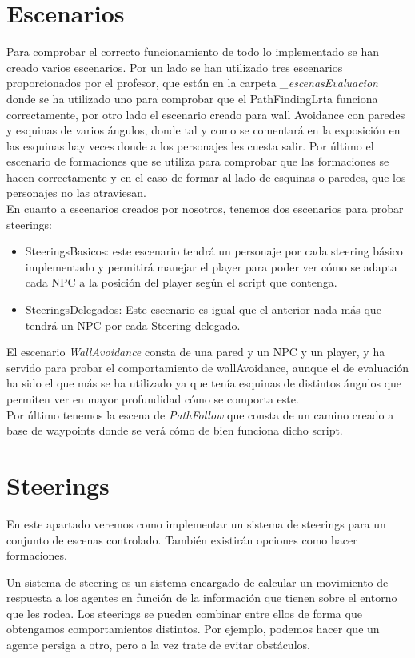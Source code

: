 \section{Escenarios}
Para comprobar el correcto funcionamiento de todo lo implementado se han creado varios escenarios. Por un lado se han utilizado tres escenarios proporcionados por el profesor, que están en la carpeta \textit{\_escenasEvaluacion} donde se ha utilizado uno para comprobar que el PathFindingLrta funciona correctamente, por otro lado el escenario creado para wall Avoidance con paredes y esquinas de varios ángulos, donde tal y como se comentará en la exposición en las esquinas hay veces donde a los personajes les cuesta salir. Por último el escenario de formaciones que se utiliza para comprobar que las formaciones se hacen correctamente y en el caso de formar al lado de esquinas o paredes, que los personajes no las atraviesan.\\

En cuanto a escenarios creados por nosotros, tenemos dos escenarios para probar steerings:
\begin{itemize}
    \item SteeringsBasicos: este escenario tendrá un personaje por cada steering básico implementado y permitirá manejar el player para poder ver cómo se adapta cada NPC a la posición del player según el script que contenga.
    \item SteeringsDelegados: Este escenario es igual que el anterior nada más que tendrá un NPC por cada Steering delegado.
\end{itemize}
El escenario \textit{WallAvoidance} consta de una pared y un NPC y un player, y ha servido para probar el comportamiento de wallAvoidance, aunque el de evaluación ha sido el que más se ha utilizado ya que tenía esquinas de distintos ángulos que permiten ver en mayor profundidad cómo se comporta este. \\

Por último tenemos la escena de \textit{PathFollow} que consta de un camino creado a base de waypoints donde se verá cómo de bien funciona dicho script.
\section{Steerings}

En este apartado veremos como implementar un sistema de steerings para un conjunto de escenas controlado. También existirán opciones como hacer formaciones.

Un sistema de steering es un sistema encargado de calcular un movimiento de respuesta a los agentes en función de la información que tienen sobre el entorno que les rodea. Los steerings se pueden combinar entre ellos de forma que obtengamos comportamientos distintos. Por ejemplo, podemos hacer que un agente persiga a otro, pero a la vez trate de evitar obstáculos.

